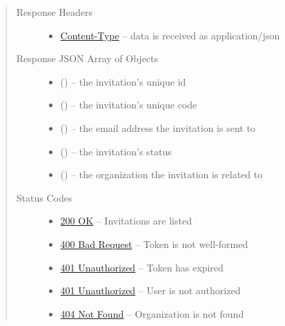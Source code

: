 \documentclass[letterpaper,10pt,english]{sphinxmanual}
\begin{document}
\begin{fulllineitems}
\begin{quote}
\begin{description}
\begin{itemize}
\end{itemize}

\item[{Response Headers}] \leavevmode\begin{itemize}
\item {} 
\href{http://tools.ietf.org/html/rfc7231\#section-3.1.1.5}{Content-Type} -- data is received as application/json

\end{itemize}

\item[{Response JSON Array of Objects}] \leavevmode\begin{itemize}
\item {} 
 () -- the invitation's unique id

\item {} 
 () -- the invitation's unique code

\item {} 
 () -- the email address the invitation is sent to

\item {} 
 () -- the invitation's status

\item {} 
 () -- the organization the invitation is
related to

\end{itemize}

\item[{Status Codes}] \leavevmode\begin{itemize}
\item {} 
\href{http://www.w3.org/Protocols/rfc2616/rfc2616-sec10.html\#sec10.2.1}{200 OK} -- Invitations are listed

\item {} 
\href{http://www.w3.org/Protocols/rfc2616/rfc2616-sec10.html\#sec10.4.1}{400 Bad Request} -- Token is not well-formed

\item {} 
\href{http://www.w3.org/Protocols/rfc2616/rfc2616-sec10.html\#sec10.4.2}{401 Unauthorized} -- Token has expired

\item {} 
\href{http://www.w3.org/Protocols/rfc2616/rfc2616-sec10.html\#sec10.4.2}{401 Unauthorized} -- User is not authorized

\item {} 
\href{http://www.w3.org/Protocols/rfc2616/rfc2616-sec10.html\#sec10.4.5}{404 Not Found} -- Organization is not found

\end{itemize}

\end{description}\end{quote}

\end{fulllineitems}
\end{document}

